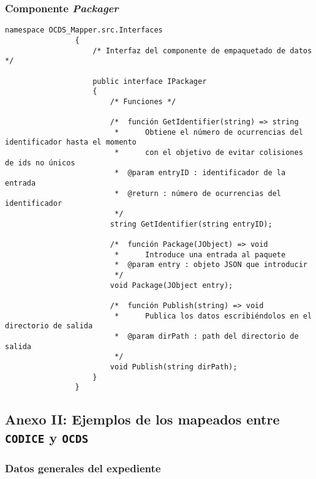         \subsubsection{Componente \textit{Packager}}
            \begin{lstlisting}[language=lCSharp]
                namespace OCDS_Mapper.src.Interfaces
                {
                    /* Interfaz del componente de empaquetado de datos  */
                
                    public interface IPackager
                    {
                        /* Funciones */
                
                        /*  función GetIdentifier(string) => string
                         *      Obtiene el número de ocurrencias del identificador hasta el momento
                         *      con el objetivo de evitar colisiones de ids no únicos
                         *  @param entryID : identificador de la entrada
                         *  @return : número de ocurrencias del identificador
                         */
                        string GetIdentifier(string entryID);
                
                        /*  función Package(JObject) => void
                         *      Introduce una entrada al paquete
                         *  @param entry : objeto JSON que introducir
                         */
                        void Package(JObject entry);
                
                        /*  función Publish(string) => void
                         *      Publica los datos escribiéndolos en el directorio de salida
                         *  @param dirPath : path del directorio de salida
                         */
                        void Publish(string dirPath);
                    }
                }
            \end{lstlisting}
            
\newpage

    \subsection{Anexo II: Ejemplos de los mapeados entre \texttt{CODICE} y \texttt{OCDS}}

        \subsubsection{Datos generales del expediente}
